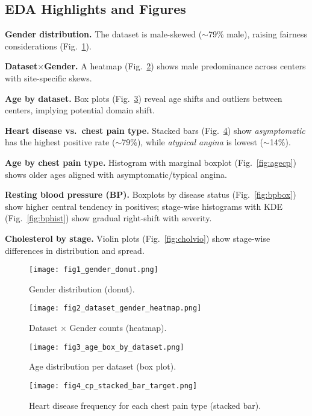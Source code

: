 \documentclass[conference]{IEEEtran}
\begin{document}
\subsection{EDA Highlights and Figures}
\textbf{Gender distribution.} The dataset is male-skewed (\(\sim\)79\% male), raising fairness considerations (Fig.~\ref{fig:gender}).

\textbf{Dataset$\times$Gender.} A heatmap (Fig.~\ref{fig:heatmap}) shows male predominance across centers with site-specific skews.

\textbf{Age by dataset.} Box plots (Fig.~\ref{fig:agebox}) reveal age shifts and outliers between centers, implying potential domain shift.

\textbf{Heart disease vs.\ chest pain type.} Stacked bars (Fig.~\ref{fig:cpstack}) show \textit{asymptomatic} has the highest positive rate ($\sim$79\%), while \textit{atypical angina} is lowest ($\sim$14\%).

\textbf{Age by chest pain type.} Histogram with marginal boxplot (Fig.~\ref{fig:agecp}) shows older ages aligned with asymptomatic/typical angina.

\textbf{Resting blood pressure (BP).} Boxplots by disease status (Fig.~\ref{fig:bpbox}) show higher central tendency in positives; stage-wise histograms with KDE (Fig.~\ref{fig:bphist}) show gradual right-shift with severity.

\textbf{Cholesterol by stage.} Violin plots (Fig.~\ref{fig:cholvio}) show stage-wise differences in distribution and spread.

\begin{figure}[!t]
  \centering
  \texttt{[image: fig1\_gender\_donut.png]}
  \caption{Gender distribution (donut).}
  \label{fig:gender}
\end{figure}

\begin{figure}[!t]
  \centering
  \texttt{[image: fig2\_dataset\_gender\_heatmap.png]}
  \caption{Dataset $\times$ Gender counts (heatmap).}
  \label{fig:heatmap}
\end{figure}

\begin{figure}[!t]
  \centering
  \texttt{[image: fig3\_age\_box\_by\_dataset.png]}
  \caption{Age distribution per dataset (box plot).}
  \label{fig:agebox}
\end{figure}

\begin{figure}[!t]
  \centering
  \texttt{[image: fig4\_cp\_stacked\_bar\_target.png]}
  \caption{Heart disease frequency for each chest pain type (stacked bar).}
  \label{fig:cpstack}
\end{figure}
\end{document}
